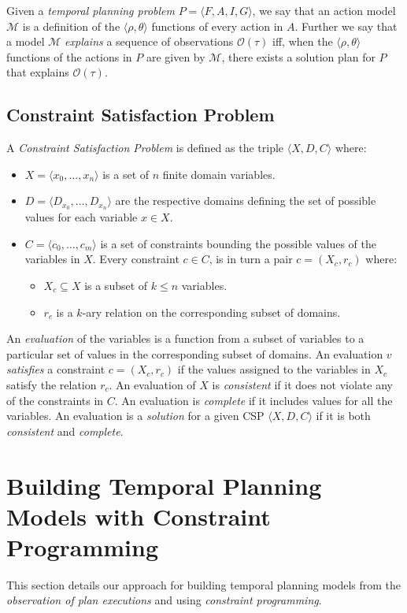 \documentclass[letterpaper]{article} %
\newcommand{\tup}[1]{{\langle #1 \rangle}}
\begin{document}
Given a {\em temporal planning problem} $P=\tup{F,A,I,G}$, we say that an action model $\mathcal{M}$ is a definition of the $\tup{\rho,\theta}$ functions of every action in $A$. Further we say that a model $\mathcal{M}$ {\em explains} a sequence of observations $\mathcal{O}(\tau)$ iff, when the $\tup{\rho,\theta}$ functions of the actions in $P$ are given by $\mathcal{M}$, there exists a solution plan for $P$ that explains $\mathcal{O}(\tau)$.


\subsection{Constraint Satisfaction Problem}
A {\em Constraint Satisfaction Problem} is defined as the triple $\tup{X,D,C}$ where:
\begin{itemize}
\item $X=\tup{x_0, \ldots, x_n}$ is a set of $n$ finite domain variables.
\item $D=\tup{D_{x_0}, \ldots, D_{x_n}}$ are the respective domains defining the set of possible values for each variable $x\in X$.
\item $C=\tup{c_0, \ldots, c_m}$ is a set of constraints bounding the possible values of the variables in $X$. Every constraint $c\in C$, is in turn a pair $c=(X_c,r_c)$ where:
\begin{itemize}
\item $X_c\subseteq X$ is a subset of $k\leq n$ variables.
\item $r_c$ is a $k$-ary relation on the corresponding subset of domains.
\end{itemize}
\end{itemize}

An {\em evaluation} of the variables is a function from a subset of variables to a particular set of values in the corresponding subset of domains. An evaluation $v$ {\em satisfies} a constraint $c=(X_c,r_c)$ if the values assigned to the variables in $X_c$ satisfy the relation $r_c$. An evaluation of $X$ is {\em consistent} if it does not violate any of the constraints in $C$. An evaluation is {\em complete} if it includes values for all the variables. An evaluation is a {\em solution} for a given CSP $\tup{X,D,C}$ if it is both {\em consistent} and {\em complete}.

\section{Building Temporal Planning Models with Constraint Programming}
\label{sec:learning}
This section details our approach for building temporal planning models from the {\em observation of plan executions} and using {\em constraint programming}.
\end{document}
